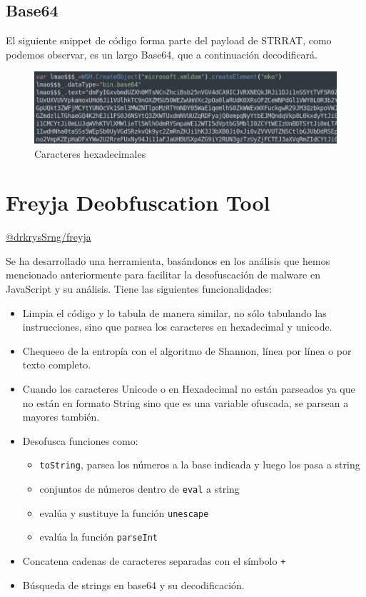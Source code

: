 \documentclass[15pt]{article}
\begin{document}
	\subsection{Base64}
	El siguiente snippet de código forma parte del payload de STRRAT\cite{javascript_malware}, como podemos observar, es un largo Base64, que a continuación decodificará.
	
	\begin{figure}[H]
		\centering
		\includegraphics[width=15cm]{images/base64.png}
		\caption{Caracteres hexadecimales}
	\end{figure}
	
	
	\newpage
	\section{Freyja Deobfuscation Tool}
	\href{https://github.com/drkrysSrng/freyja}{@drkrysSrng/freyja}
	
	Se ha desarrollado una herramienta, basándonos en los análisis que hemos mencionado anteriormente para facilitar la desofuscación de malware en JavaScript y su análisis. Tiene las siguientes funcionalidades:
	
	\begin{itemize}
		\item Limpia el código y lo tabula de manera similar, no sólo tabulando las instrucciones, sino que parsea los caracteres en hexadecimal y unicode.
		\item Chequeeo de la entropía con el algoritmo de Shannon, línea por línea o por texto completo.
		\item Cuando los caracteres Unicode o en Hexadecimal no están parseados ya que no están en formato String sino que es una variable ofuscada, se parsean a mayores también.
		\item Desofusca funciones como:
		\begin{itemize}
			\item \verb*|toString|, parsea los números a la base indicada y luego los pasa a string
			\item conjuntos de números dentro de \verb*|eval| a string
			\item evalúa y sustituye la función \verb*|unescape|
			\item evalúa la función \verb*|parseInt|
		\end{itemize}
		\item Concatena cadenas de caracteres separadas con el símbolo \verb*|+|
		\item Búsqueda de strings en base64 y su decodificación.
	\end{itemize}
	
\end{document}

